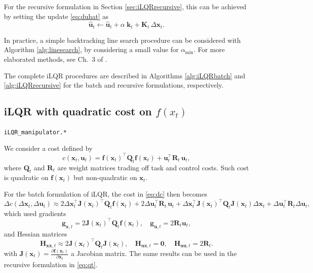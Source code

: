 \documentclass[10pt,a4paper]{article} %
\newcommand{\trsp}{{\scriptscriptstyle\top}}
\newcommand{\filename}[1]{\colorbox{rr2}{\color{white}\texttt{#1}}}
\begin{document}
For the recursive formulation in Section \ref{sec:iLQRrecursive}, this can be achieved by setting the update \eqref{eq:duhat} as
\begin{equation}
	\bm{\hat{u}}_t \leftarrow \bm{\hat{u}}_t + \alpha \; \bm{k}_t + \bm{K}_t \, \Delta\bm{x}_t.
	\label{eq:alpha2}
\end{equation}

In practice, a simple backtracking line search procedure can be considered with Algorithm \ref{alg:linesearch}, by considering a small value for $\alpha_{\min}$. For more elaborated methods, see Ch.~3 of \cite{Nocedal06}. 

The complete iLQR procedures are described in Algorithms \ref{alg:iLQRbatch} and \ref{alg:iLQRrecursive} for the batch and recursive formulations, respectively.


\subsection{iLQR with quadratic cost on {\boldmath$f(x_t)$}} 
\begin{flushright}
\filename{iLQR\_manipulator.*}
\end{flushright}

We consider a cost defined by
\begin{equation}
	c(\bm{x}_t,\bm{u}_t) = \bm{f}(\bm{x}_t)^{\!\trsp} \bm{Q}_t \bm{f}(\bm{x}_t) + \bm{u}_t^\trsp \bm{R}_t \, \bm{u}_t, 
\end{equation}
where $\bm{Q}_t$ and $\bm{R}_t$ are weight matrices trading off task and control costs. Such cost is quadratic on $\bm{f}(\bm{x}_t)$ but non-quadratic on $\bm{x}_t$.

For the batch formulation of iLQR, the cost in \eqref{eq:dc} then becomes
\begin{equation}
	\Delta c(\Delta\bm{x}_t,\Delta\bm{u}_t) \approx 
	2 \Delta\bm{x}_t^\trsp \bm{J}(\bm{x}_t)^\trsp \bm{Q}_t \bm{f}(\bm{x}_t) + 2 \Delta\bm{u}_t^\trsp \bm{R}_t \, \bm{u}_t +
	\Delta\bm{x}_t^\trsp \bm{J}(\bm{x}_t)^\trsp \bm{Q}_t \bm{J}(\bm{x}_t) \Delta\bm{x}_t + \Delta\bm{u}_t^\trsp \bm{R}_t \Delta\bm{u}_t,
\end{equation}
which used gradients
\begin{equation}
	\bm{g}_{\bm{x},t} = 2 \bm{J}(\bm{x}_t)^\trsp \bm{Q}_t \bm{f}(\bm{x}_t)
	,\quad
	\bm{g}_{\bm{u},t} = 2 \bm{R}_t \bm{u}_t,
	\label{eq:dcdx}
\end{equation}
and Hessian matrices
\begin{equation}
	\bm{H}_{\bm{x}\bm{x},t} \approx 2 \bm{J}(\bm{x}_t)^\trsp \bm{Q}_t \bm{J}(\bm{x}_t)
	,\quad
	\bm{H}_{\bm{u}\bm{x},t} = \bm{0}
	,\quad
	\bm{H}_{\bm{u}\bm{u},t} = 2 \bm{R}_t.
\end{equation}
with $\bm{J}(\bm{x}_t)=\frac{\partial\bm{f}(\bm{x}_t)}{\partial\bm{x}_t}$ a Jacobian matrix. The same results can be used in the recursive formulation in \eqref{eq:qt}.
\end{document}
